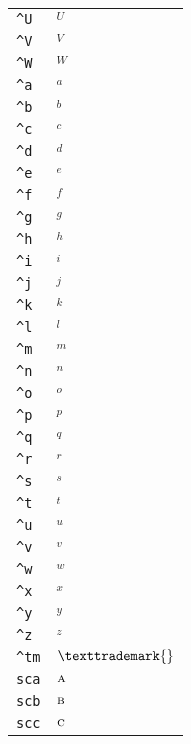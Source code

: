 \begin{longtable}{ll}
\texttt{\textasciicircum U}&${}^U{}$\\
\texttt{\textasciicircum V}&${}^V{}$\\
\texttt{\textasciicircum W}&${}^W{}$\\
\texttt{\textasciicircum a}&${}^a{}$\\
\texttt{\textasciicircum b}&${}^b{}$\\
\texttt{\textasciicircum c}&${}^c{}$\\
\texttt{\textasciicircum d}&${}^d{}$\\
\texttt{\textasciicircum e}&${}^e{}$\\
\texttt{\textasciicircum f}&${}^f{}$\\
\texttt{\textasciicircum g}&${}^g{}$\\
\texttt{\textasciicircum h}&${}^h{}$\\
\texttt{\textasciicircum i}&${}^i{}$\\
\texttt{\textasciicircum j}&${}^j{}$\\
\texttt{\textasciicircum k}&${}^k{}$\\
\texttt{\textasciicircum l}&${}^l{}$\\
\texttt{\textasciicircum m}&${}^m{}$\\
\texttt{\textasciicircum n}&${}^n{}$\\
\texttt{\textasciicircum o}&${}^o{}$\\
\texttt{\textasciicircum p}&${}^p{}$\\
\texttt{\textasciicircum q}&${}^q{}$\\
\texttt{\textasciicircum r}&${}^r{}$\\
\texttt{\textasciicircum s}&${}^s{}$\\
\texttt{\textasciicircum t}&${}^t{}$\\
\texttt{\textasciicircum u}&${}^u{}$\\
\texttt{\textasciicircum v}&${}^v{}$\\
\texttt{\textasciicircum w}&${}^w{}$\\
\texttt{\textasciicircum x}&${}^x{}$\\
\texttt{\textasciicircum y}&${}^y{}$\\
\texttt{\textasciicircum z}&${}^z{}$\\
\texttt{\textasciicircum tm}&${}\texttrademark{}$\\
\texttt{sca}&${}{\textsc{a}}{}$\\
\texttt{scb}&${}{\textsc{b}}{}$\\
\texttt{scc}&${}{\textsc{c}}{}$\\

\end{longtable}
